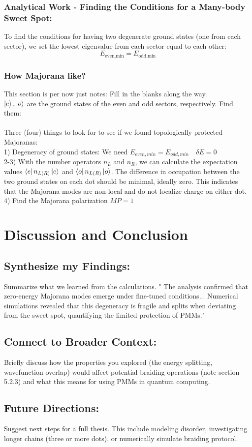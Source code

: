 \documentclass[11pt, letterpaper, titlepage]{article}
\begin{document}
\subsubsection{Analytical Work - Finding the Conditions for a Many-body Sweet Spot:}
To find the conditions for having two degenerate ground states (one from each sector), we set the lowest eigenvalue from each sector equal to each other:
$$E_{\text{even,min}} = E_{\text{odd,min}}$$


\subsubsection{How Majorana like?}
This section is per now just notes: Fill in the blanks along the way.\\
$\ket{e}, \ket{o}$ are the ground states of the even and odd sectors, respectively. Find them:\\\\
Three (four) things to look for to see if we found topologically protected Majoranas:\\
1) Degeneracy of ground states: We need $E_{even,min} = E_{odd,min}\quad  δE=0$\\
2-3) With the number operators $n_L$ and $n_R$, we can calculate the expectation values $\bra{e}n_{L(R)}\ket{e}$ and $\bra{o}n_{L(R)}\ket{o}$. The difference in occupation between the two ground states on each dot should be minimal, ideally zero. This indicates that the Majorana modes are non-local and do not localize charge on either dot.\\
4) Find the Majorana polarization $MP = 1$

\section{Discussion and Conclusion}
\subsection{Synthesize my Findings:} Summarize what we learned from the calculations. " The analysis confirmed that zero-energy Majorana modes emerge under fine-tuned conditions... Numerical simulations revealed that this degeneracy is fragile and splits when deviating from the sweet spot, quantifying the limited protection of PMMs."\par
\subsection{Connect to Broader Context:} Briefly discuss how the properties you explored (the energy splitting, wavefunction overlap) would affect potential braiding operations (note section 5.2.3) and what this means for using PMMs in quantum computing.\par
\subsection{Future Directions:} Suggest next steps for a full thesis. This include modeling disorder, investigating longer chains (three or more dots), or numerically simulate braiding protocol.
\end{document}
